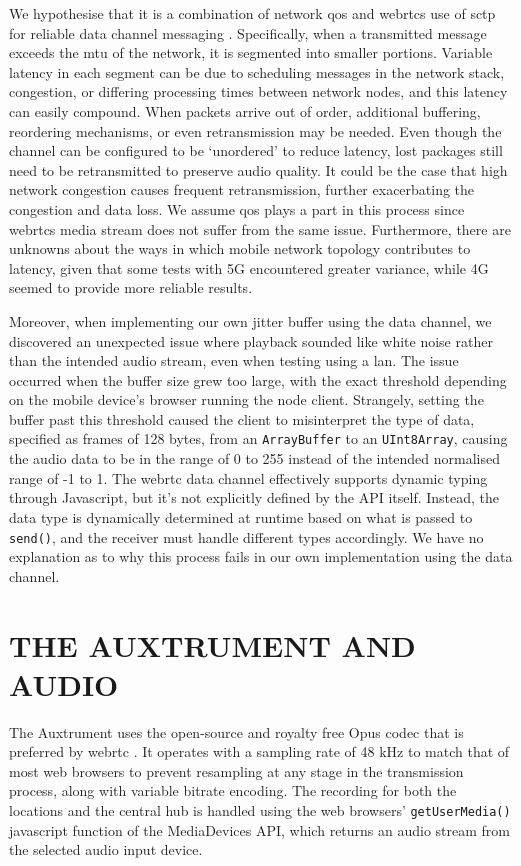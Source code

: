 \documentclass[fleqn]{jaes}
\begin{document}
We hypothesise that it is a combination of network \gls{qos} and \Glspl{webrtc} use of \gls{sctp} for reliable data channel messaging \cite{stewart2022rfc}. Specifically, when a transmitted message exceeds the \gls{mtu} of the network, it is segmented into smaller portions. Variable latency in each segment can be due to scheduling messages in the network stack, congestion, or differing processing times between network nodes, and this latency can easily compound. When packets arrive out of order, additional buffering, reordering mechanisms, or even retransmission may be needed. Even though the channel can be configured to be `unordered' to reduce latency, lost packages still need to be retransmitted to preserve audio quality. It could be the case that high network congestion causes frequent retransmission, further exacerbating the congestion and data loss. We assume \gls{qos} plays a part in this process since \Glspl{webrtc} media stream does not suffer from the same issue. Furthermore, there are unknowns about the ways in which mobile network topology contributes to latency, given that some tests with 5G encountered greater variance, while 4G seemed to provide more reliable results.

Moreover, when implementing our own jitter buffer using the data channel, we discovered an unexpected issue where playback sounded like white noise rather than the intended audio stream, even when testing using a \gls{lan}. The issue occurred when the buffer size grew too large, with the exact threshold depending on the mobile device's browser running the node client. Strangely, setting the buffer past this threshold caused the client to misinterpret the type of data, specified as frames of 128 bytes, from an \texttt{ArrayBuffer} to an \texttt{UInt8Array}, causing the audio data to be in the range of 0 to 255 instead of the intended normalised range of -1 to 1. The \gls{webrtc} data channel effectively supports dynamic typing through Javascript, but it's not explicitly defined by the API itself. Instead, the data type is dynamically determined at runtime based on what is passed to \texttt{send()}, and the receiver must handle different types accordingly. We have no explanation as to why this process fails in our own implementation using the data channel.

\section{THE AUXTRUMENT AND AUDIO}
The Auxtrument uses the open-source and royalty free Opus codec that is preferred by \gls{webrtc} \cite{valin2012rfc}. It operates with a sampling rate of 48 kHz to match that of most web browsers to prevent resampling at any stage in the transmission process, along with variable bitrate encoding. The recording for both the locations and the central hub is handled using the web browsers’ \texttt{get\-UserMedia()} javascript function of the MediaDevices API, which returns an audio stream from the selected audio input device.
\end{document}
